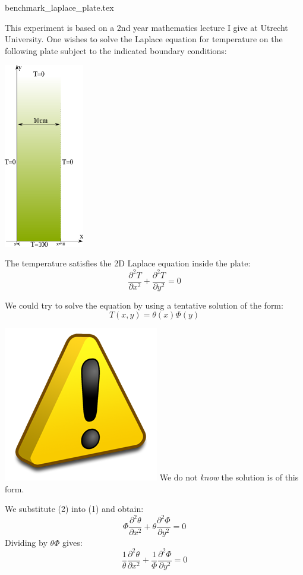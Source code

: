 \begin{flushright} {\tiny {\color{gray} benchmark\_laplace\_plate.tex}} \end{flushright}

This experiment is based on a 2nd year mathematics lecture I give at Utrecht University. 
One wishes to solve the Laplace equation for temperature on the following plate subject 
to the indicated boundary conditions:

\begin{center}
\includegraphics[width=3.5cm]{images/benchmark_lapplate/laplace2.png}
\end{center}


The temperature satisfies the 2D Laplace equation inside the plate:
\begin{equation}
\frac{\partial^2 T}{\partial x^2}
+ \frac{\partial^2 T}{\partial y^2} = 0
\end{equation}

We could try to solve the equation by using a tentative solution of the form:
\begin{equation}
T(x,y)=\theta(x) \Phi(y)
\end{equation}

\includegraphics[width=.5cm]{images/benchmark_lapplate/warning.png}
We do not {\it know} the solution is of this form.

We substitute (2) into (1) and obtain:
\[
\Phi \frac{\partial^2 \theta}{\partial x^2} +
\theta \frac{\partial^2 \Phi}{\partial y^2} = 0
\]
Dividing by $\theta\Phi$ gives:
\[
\frac{1}{\theta} \frac{\partial^2 \theta}{\partial x^2} +
\frac{1}{\Phi} \frac{\partial^2 \Phi}{\partial y^2} = 0
\]

